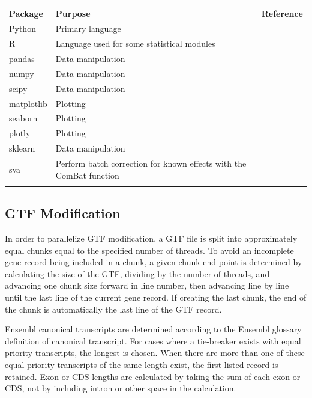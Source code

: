 \documentclass[11pt, a4paper, oneside]{article}
\begin{document}
\begin{tabular}{p{2.4cm}p{7.5cm}p{3cm}}
 \textbf{Package} & \textbf{Purpose} & \textbf{Reference} \\
 \hline
 Python & Primary language & \\
 \hline
 R & Language used for some statistical modules & \\
 \hline
 pandas & Data manipulation & \cite{pandas} \\
 \hline
 numpy & Data manipulation & \cite{numpy1, numpy2} \\
 \hline
 scipy & Data manipulation & \cite{scipy} \\
 \hline
 matplotlib & Plotting & \cite{matplotlib} \\
 \hline
 seaborn & Plotting & \cite{seaborn} \\
 \hline
 plotly & Plotting & \cite{plotly} \\
 \hline
 sklearn & Data manipulation & \cite{sklearn} \\
 \hline
 sva & Perform batch correction for known effects with the ComBat function & \cite{sva} \\
 \label{Tab:software_plot}
 \end{tabular}
 \newline

\subsection{GTF Modification}
In order to parallelize GTF modification, a GTF file is split into approximately equal chunks equal to the specified number of threads. To avoid an incomplete gene record being included in a chunk, a given chunk end point is determined by calculating the size of the GTF, dividing by the number of threads, and advancing one chunk size forward in line number, then advancing line by line until the last line of the current gene record. If creating the last chunk, the end of the chunk is automatically the last line of the GTF record. \par

Ensembl canonical transcripts are determined according to the Ensembl glossary definition of canonical transcript. For cases where a tie-breaker exists with equal priority transcripts, the longest is chosen. When there are more than one of these equal priority transcripts of the same length exist, the first listed record is retained. Exon or CDS lengths are calculated by taking the sum of each exon or CDS, not by including intron or other space in the calculation. \par
\end{document}
